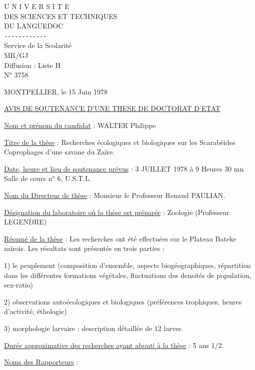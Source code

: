 U N I V E R S I T E\\
DES SCIENCES ET TECHNIQUES\\
DU LANGUEDOC\\
\texttt{-{}-{}-{}-{}-{}-{}-{}-{}-{}-{}-{}-}\\
Service de la Scolarité\\
MR/GJ\\
Diffusion : Liste H\\
N° 3758

MONTPELLIER, le 15 Juin 1978

\uline{AVIS DE SOUTENANCE D'UNE THESE DE DOCTORAT D'ETAT}

\uline{Nom et prénom du candidat} : WALTER Philippe

\uline{Titre de la thèse} : Recherches écologiques et biologiques sur les Scarabéides Coprophages d'une savane du Zaïre.

\uline{Date, heure et lieu de soutenance prévus} : 3 JUILLET 1978 à 9 Heures 30 mn\\
Salle de cours n° 6, U.S.T.L.

\uline{Nom du Directeur de thèse} : Monsieur le Professeur Renaud PAULIAN.

\uline{Désignation du laboratoire où la thèse est préparée} : Zoologie (Professeur LEGENDRE)

\uline{Résumé de la thèse} : Les recherches ont été effectuées sur le Plateau Bateke zaïrois. Les résultats sont présentés en trois parties :

1) le peuplement (composition d'ensemble, aspects biogéographiques, répartition dans les différentes formations végétales, fluctuations des densités de population, sex-ratio)

2) observations autoécologiques et biologiques (préférences trophiques, heures d'activité, éthologie)

3) morphologie larvaire : description détaillée de 12 larves.

\uline{Durée approximative des recherches ayant abouti à la thèse} : 5 ans 1/2.

\uline{Noms des Rapporteurs} :



